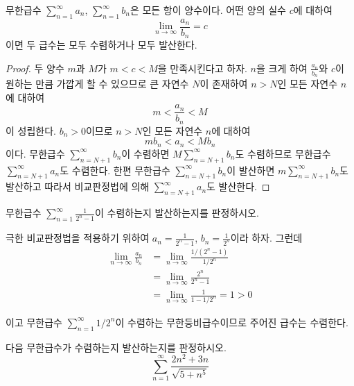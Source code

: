 \documentclass[11pt, a4paper]{book}
\begin{document}
 \begin{theorem}[극한 비교판정법]
 	무한급수 $\displaystyle \sum_{n=1}^{\infty}a_{n}$, $\displaystyle \sum_{n=1}^{\infty}b_{n}$은 모든 항이 양수이다. 어떤 양의 실수 $c$에 대하여
 	\begin{equation*}
 		\lim\limits_{n \to \infty} \frac{a_{n}}{b_{n}} = c
 	\end{equation*}
 이면 두 급수는 모두 수렴하거나 모두 발산한다.
 \end{theorem}
\begin{proof}
	두 양수 $m$과 $M$가 $m < c<M$을 만족시킨다고 하자. $n$을 크게 하여  $\frac{a_{n}}{b_n}$와 $c$이 원하는 만큼 가깝게 할 수 있으므로 큰 자연수 $N$이 존재하여 $n>N$인 모든 자연수 $n$에 대하여
	\begin{equation*}
		m < \frac{a_{n}}{b_{n}} <M
	\end{equation*} 
이 성립한다. $b_{n}>0$이므로 $n>N$인 모든 자연수 $n$에 대하여
	\begin{equation*}
	mb_{n} < a_{n} < M b_{n}
\end{equation*} 
이다.  무한급수 $\displaystyle \sum_{n=N+1}^{\infty}b_{n}$이 수렴하면  $\displaystyle M \sum_{n=N+1}^{\infty}b_{n}$도 수렴하므로 무한급수 $\displaystyle \sum_{n=N+1}^{\infty}a_{n}$도 수렴한다. 한편  무한급수 $\displaystyle \sum_{n=N+1}^{\infty}b_{n}$이 발산하면  $\displaystyle m\sum_{n=N+1}^{\infty}b_{n}$도 발산하고 따라서 비교판정법에 의해 $\displaystyle \sum_{n=N+1}^{\infty}a_{n}$도 발산한다.
\end{proof}
\vspace{1em}
\begin{example}
	무한급수 $\displaystyle \sum_{n=1}^{\infty}\frac{1}{2^{n}-1}$이 수렴하는지 발산하는지를 판정하시오.
	\begin{solution}
		극한 비교판정법을 적용하기 위하여 $a_{n}=\frac{1}{2^{n}-1}$, $b_{n}=\frac{1}{2^{n}}$이라 하자. 그런데
		\begin{align*}
			\lim_{n \to \infty}\frac{a_{n}}{b_{n}} &= \lim_{n \to \infty}  \frac{1/(2^n -1)}{1/2^n} \\
			&= \lim_{n \to \infty} \frac{2^n}{2^n -1} \\
			& = \lim_{n \to \infty} \frac{1}{1-1/2^n} = 1>0
		\end{align*}
	\end{solution}
이고 무한급수 $\sum_{n=1}^{\infty}1/2^n$이 수렴하는 무한등비급수이므로 주어진 급수는 수렴한다.
\end{example}
\vspace{1em}
\begin{problem}
	다음 무한급수가 수렴하는지 발산하는지를 판정하시오.
	\begin{equation*}
		\sum_{n=1}^{\infty} \frac{2n^2 +3n}{\sqrt{5+n^{5}}}
	\end{equation*}
\end{problem}
\end{document}
